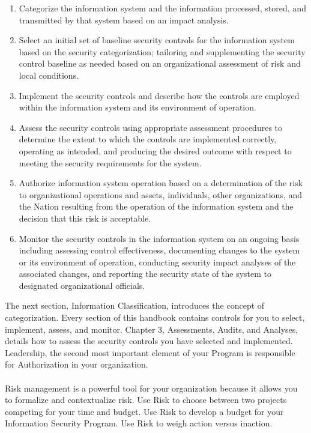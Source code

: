 \begin{enumerate}
\item Categorize the information system and the information processed, stored, and transmitted by that system based on an impact analysis.
\item Select an initial set of baseline security controls for the information system based on the security categorization; tailoring and supplementing the security control baseline as needed based on an organizational assessment of risk and local conditions.
\item Implement the security controls and describe how the controls are employed within the information system and its environment of operation.
\item Assess the security controls using appropriate assessment procedures to determine the extent to which the controls are implemented correctly, operating as intended, and producing the desired outcome with respect to meeting the security requirements for the system.
\item Authorize information system operation based on a determination of the risk to organizational operations and assets, individuals, other organizations, and the Nation resulting from the operation of the information system and the decision that this risk is acceptable.
\item Monitor the security controls in the information system on an ongoing basis including assessing control effectiveness, documenting changes to the system or its environment of operation, conducting security impact analyses of the associated changes, and reporting the security state of the system to designated organizational officials.
\end{enumerate}
The next section, Information Classification, introduces the concept of categorization. Every section of this handbook contains controls for you to select, implement, assess, and monitor. Chapter 3, Assessments, Audits, and Analyses, details how to assess the security controls you have selected and implemented. Leadership, the second most important element of your Program is responsible for Authorization in your organization.\\\\
Risk management is a powerful tool for your organization because it allows you to formalize and contextualize risk. Use Risk to choose between two projects competing for your time and budget. Use Risk to develop a budget for your Information Security Program. Use Risk to weigh action versus inaction.\\
